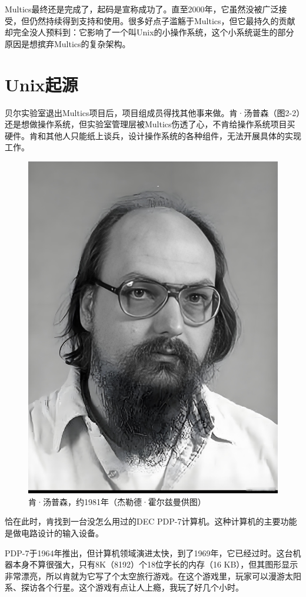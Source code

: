 \documentclass[a4paper,12pt,UTF8,twoside]{ctexbook}
\begin{document}
Multics最终还是完成了，起码是宣称成功了。直至2000年，它虽然没被广泛接受，但仍然持续得到支持和使用。很多好点子滥觞于Multics，但它最持久的贡献却完全没人预料到：它影响了一个叫Unix的小操作系统，这个小系统诞生的部分原因是想摈弃Multics的复杂架构。

\section{Unix起源}

贝尔实验室退出Multics项目后，项目组成员得找其他事来做。肯·汤普森（图2-2）还是想做操作系统，但实验室管理层被Multics伤透了心，不肯给操作系统项目买硬件。肯和其他人只能纸上谈兵，设计操作系统的各种组件，无法开展具体的实现工作。

\begin{figure}[htbp]
	\centering
	\includegraphics[width=0.7\linewidth]{14}
	\caption{肯·汤普森，约1981年（杰勒德·霍尔兹曼供图）}
	\label{fig:1}
\end{figure}

恰在此时，肯找到一台没怎么用过的DEC PDP-7计算机。这种计算机的主要功能是做电路设计的输入设备。

PDP-7于1964年推出，但计算机领域演进太快，到了1969年，它已经过时。这台机器本身不算很强大，只有8K（8192）个18位字长的内存（16 KB），但其图形显示非常漂亮，所以肯就为它写了个太空旅行游戏。在这个游戏里，玩家可以漫游太阳系、探访各个行星。这个游戏有点让人上瘾，我玩了好几个小时。
\end{document}
